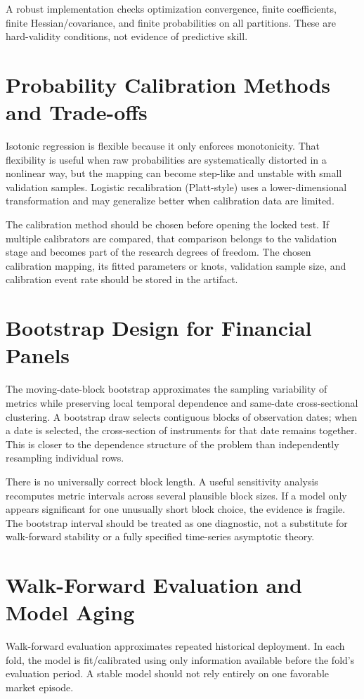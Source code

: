 \documentclass[11pt]{article}
\begin{document}
A robust implementation checks optimization convergence, finite coefficients, finite Hessian/covariance, and finite probabilities on all partitions. These are hard-validity conditions, not evidence of predictive skill.

\section{Probability Calibration Methods and Trade-offs}
Isotonic regression is flexible because it only enforces monotonicity. That flexibility is useful when raw probabilities are systematically distorted in a nonlinear way, but the mapping can become step-like and unstable with small validation samples. Logistic recalibration (Platt-style) uses a lower-dimensional transformation and may generalize better when calibration data are limited.

The calibration method should be chosen before opening the locked test. If multiple calibrators are compared, that comparison belongs to the validation stage and becomes part of the research degrees of freedom. The chosen calibration mapping, its fitted parameters or knots, validation sample size, and calibration event rate should be stored in the artifact.

\section{Bootstrap Design for Financial Panels}
The moving-date-block bootstrap approximates the sampling variability of metrics while preserving local temporal dependence and same-date cross-sectional clustering. A bootstrap draw selects contiguous blocks of observation dates; when a date is selected, the cross-section of instruments for that date remains together. This is closer to the dependence structure of the problem than independently resampling individual rows.

There is no universally correct block length. A useful sensitivity analysis recomputes metric intervals across several plausible block sizes. If a model only appears significant for one unusually short block choice, the evidence is fragile. The bootstrap interval should be treated as one diagnostic, not a substitute for walk-forward stability or a fully specified time-series asymptotic theory.

\section{Walk-Forward Evaluation and Model Aging}
Walk-forward evaluation approximates repeated historical deployment. In each fold, the model is fit/calibrated using only information available before the fold's evaluation period. A stable model should not rely entirely on one favorable market episode.
\end{document}
